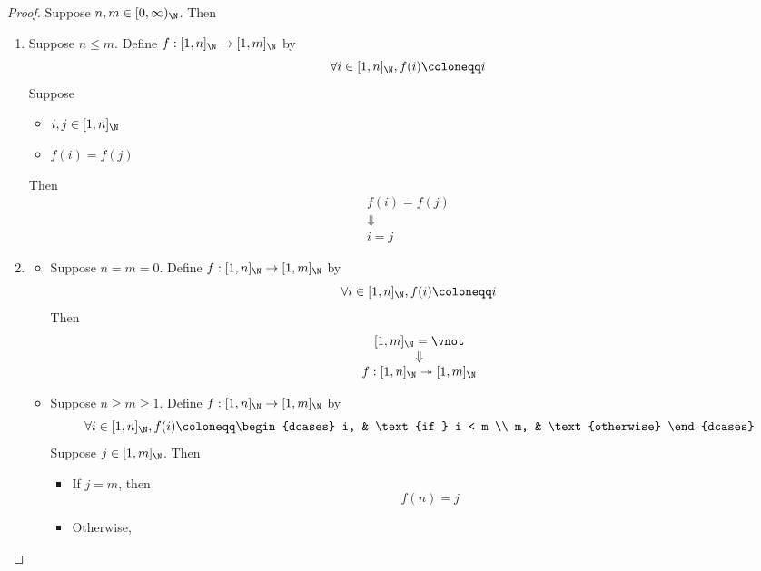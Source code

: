 \begin{proof}
  Suppose $n, m \in [0, \infty)_{\N}$. Then
  \begin{enumerate}[label=\textbf{(\Alph*)}]
    \item Suppose $n \leq m$. Define $f: [1, n]_{\N} \to [1, m]_{\N}$ by
          \[
            \forall i \in [1, n]_{\N}, f(i) \coloneqq i
          \]
          Suppose
          \begin{itemize}
            \item $i, j \in [1, n]_{\N}$
            \item $f(i) = f(j)$
          \end{itemize}
          Then
          \[
            \begin{array}{c}
              f(i) = f(j) \\
              \Downarrow  \\
              i = j
            \end{array}
          \]
    \item \begin{itemize}
            \item Suppose $n = m = 0$. Define $f: [1, n]_{\N} \to [1, m]_{\N}$ by
                  \[
                    \forall i \in [1, n]_{\N}, f(i) \coloneqq i
                  \]
                  Then
                  \[
                    \begin{array}{c}
                      [1, m]_{\N} = \vnot \\
                      \Downarrow          \\
                      f: [1, n]_{\N} \twoheadrightarrow [1, m]_{\N}
                    \end{array}
                  \]
            \item Suppose $n \geq m \geq 1$. Define $f: [1, n]_{\N} \to [1, m]_{\N}$ by
                  \[
                    \forall i \in [1, n]_{\N}, f(i) \coloneqq \begin{dcases}
                      i, & \text{if } i < m \\
                      m, & \text{otherwise}
                    \end{dcases}
                  \]
                  Suppose $j \in [1, m]_{\N}$. Then
                  \begin{itemize}
                    \item If $j = m$, then
                          \[
                            f(n) = j
                          \]
                    \item Otherwise,

\end{itemize}
\end{itemize}
\end{enumerate}
\end{proof}
